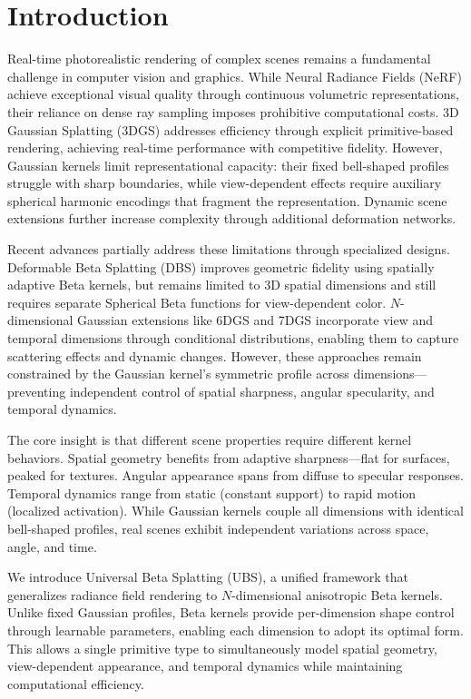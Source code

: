 \documentclass{article} %
\begin{document}
\section{Introduction}
\label{sec:introduction}

Real-time photorealistic rendering of complex scenes remains a fundamental challenge in computer vision and graphics. While Neural Radiance Fields (NeRF) \citep{mildenhall2021nerf} achieve exceptional visual quality through continuous volumetric representations, their reliance on dense ray sampling imposes prohibitive computational costs. 3D Gaussian Splatting (3DGS) \citep{3dgs} addresses efficiency through explicit primitive-based rendering, achieving real-time performance with competitive fidelity. However, Gaussian kernels limit representational capacity: their fixed bell-shaped profiles struggle with sharp boundaries, while view-dependent effects require auxiliary spherical harmonic encodings that fragment the representation. Dynamic scene extensions \citep{yang2024deformable, luiten2023dynamic} further increase complexity through additional deformation networks.

Recent advances partially address these limitations through specialized designs. Deformable Beta Splatting (DBS) \citep{liu2025deformable} improves geometric fidelity using spatially adaptive Beta kernels, but remains limited to 3D spatial dimensions and still requires separate Spherical Beta functions for view-dependent color. $N$-dimensional Gaussian extensions like 6DGS \citep{gao20246dgs} and 7DGS \citep{gao20257dgs} incorporate view and temporal dimensions through conditional distributions, enabling them to capture scattering effects and dynamic changes. However, these approaches remain constrained by the Gaussian kernel's symmetric profile across dimensions—preventing independent control of spatial sharpness, angular specularity, and temporal dynamics.

The core insight is that different scene properties require different kernel behaviors. Spatial geometry benefits from adaptive sharpness—flat for surfaces, peaked for textures. Angular appearance spans from diffuse to specular responses. Temporal dynamics range from static (constant support) to rapid motion (localized activation). While Gaussian kernels couple all dimensions with identical bell-shaped profiles, real scenes exhibit independent variations across space, angle, and time.

We introduce Universal Beta Splatting (UBS), a unified framework that generalizes radiance field rendering to $N$-dimensional anisotropic Beta kernels. Unlike fixed Gaussian profiles, Beta kernels provide per-dimension shape control through learnable parameters, enabling each dimension to adopt its optimal form. This allows a single primitive type to simultaneously model spatial geometry, view-dependent appearance, and temporal dynamics while maintaining computational efficiency. 
\end{document}
